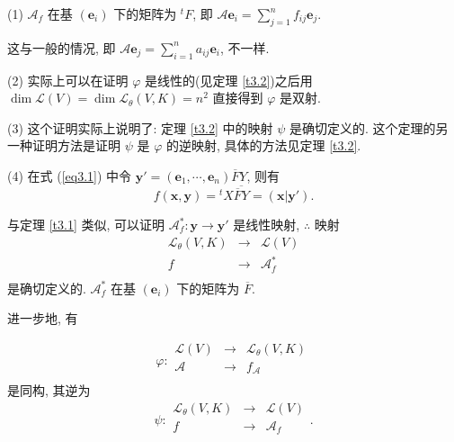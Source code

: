 \documentclass[color=black,device=normal,lang=cn,mode=geye]{elegantnote}
\begin{document}
\begin{note}
    (1) $\mathcal{A}_f$ 在基 $(\boldsymbol{e}_i)$ 下的矩阵为 ${}^tF$, 即 $\mathcal{A}\boldsymbol{e}_i=\sum\limits_{j=1}^nf_{ij}\boldsymbol{e}_j$.

    这与一般的情况, 即 $\mathcal{A}\boldsymbol{e}_j=\sum\limits_{i=1}^na_{ij}\boldsymbol{e}_i$, 不一样.

    (2) 实际上可以在证明 $\varphi$ 是线性的(见定理 \ref{t3.2})之后用 $\dim\mathcal{L}(V)=\dim\mathcal{L}_\theta(V,K)=n^2$ 直接得到 $\varphi$ 是双射.

    (3) 这个证明实际上说明了: 定理 \ref{t3.2} 中的映射 $\psi$ 是确切定义的. 这个定理的另一种证明方法是证明 $\psi$ 是 $\varphi$ 的逆映射, 具体的方法见定理 \ref{t3.2}.

    (4) 在式 (\ref{eq3.1}) 中令 $\boldsymbol{y}'=(\boldsymbol{e}_1,\cdots,\boldsymbol{e}_n)\overline{F}Y$, 则有
    \[f(\boldsymbol{x},\boldsymbol{y})={}^tX\overline{\overline{F}Y}=(\boldsymbol{x}|\boldsymbol{y}').\]

    与定理 \ref{t3.1} 类似, 可以证明 $\mathcal{A}^*_f:\boldsymbol{y}\to\boldsymbol{y}'$ 是线性映射, $\therefore$ 映射
    \[\begin{array}{rcl}
        \mathcal{L}_\theta(V,K) & \to & \mathcal{L}(V) \\
        f & \to & \mathcal{A}^*_f \\
    \end{array}\]
    是确切定义的. $\mathcal{A}^*_f$ 在基 $(\boldsymbol{e}_i)$ 下的矩阵为 $\overline{F}$.
\end{note}
进一步地, 有
\begin{theorem}\label{t3.2}
    \[\varphi:\begin{array}{rcl}
        \mathcal{L}(V) & \to & \mathcal{L}_\theta(V,K) \\
        \mathcal{A} & \to & f_\mathcal{A} \\
    \end{array}\]
    是同构, 其逆为
    \[\psi:\begin{array}{rcl}
        \mathcal{L}_\theta(V,K) & \to & \mathcal{L}(V) \\
        f & \to & \mathcal{A}_f \\
    \end{array}.\]
\end{theorem}
\end{document}
